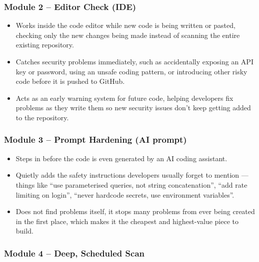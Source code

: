 \documentclass[12pt,a4paper]{article}
\begin{document}
\subsubsection{Module 2 -- Editor Check (IDE)}

\begin{itemize}
    \item Works inside the code editor while new code is being written or pasted, checking only the new changes being made instead of scanning the entire existing repository.

    \item Catches security problems immediately, such as accidentally exposing an API key or password, using an unsafe coding pattern, or introducing other risky code before it is pushed to GitHub.

    \item Acts as an early warning system for future code, helping developers fix problems as they write them so new security issues don't keep getting added to the repository.
\end{itemize}

\subsubsection{Module 3 -- Prompt Hardening (AI prompt)}

\begin{itemize}
    \item Steps in before the code is even generated by an AI coding assistant.

    \item Quietly adds the safety instructions developers usually forget to mention --- things like ``use parameterised queries, not string concatenation'', ``add rate limiting on login'', ``never hardcode secrets, use environment variables''.

    \item Does not find problems itself, it stops many problems from ever being created in the first place, which makes it the cheapest and highest-value piece to build.
\end{itemize}

\subsubsection{Module 4 -- Deep, Scheduled Scan}
\end{document}

